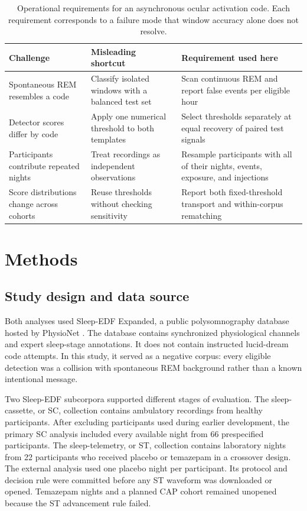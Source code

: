\documentclass[10pt,twocolumn]{article}
\begin{document}
\begin{table}[t]
\centering
\caption{Operational requirements for an asynchronous ocular activation code. Each requirement corresponds to a failure mode that window accuracy alone does not resolve.}
\label{tab:requirements}
\small
\begin{tabular}{p{}p{}p{}}
\toprule
Challenge & Misleading shortcut & Requirement used here \\
\midrule
Spontaneous REM resembles a code & Classify isolated windows with a balanced test set & Scan continuous REM and report false events per eligible hour \\
Detector scores differ by code & Apply one numerical threshold to both templates & Select thresholds separately at equal recovery of paired test signals \\
Participants contribute repeated nights & Treat recordings as independent observations & Resample participants with all of their nights, events, exposure, and injections \\
Score distributions change across cohorts & Reuse thresholds without checking sensitivity & Report both fixed-threshold transport and within-corpus rematching \\
\bottomrule
\end{tabular}
\end{table}

\section{Methods}

\subsection{Study design and data source}

Both analyses used Sleep-EDF Expanded, a public polysomnography database hosted by PhysioNet \citep{kemp2000,goldberger2000}. The database contains synchronized physiological channels and expert sleep-stage annotations. It does not contain instructed lucid-dream code attempts. In this study, it served as a negative corpus: every eligible detection was a collision with spontaneous REM background rather than a known intentional message.

Two Sleep-EDF subcorpora supported different stages of evaluation. The sleep-cassette, or SC, collection contains ambulatory recordings from healthy participants. After excluding participants used during earlier development, the primary SC analysis included every available night from 66 prespecified participants. The sleep-telemetry, or ST, collection contains laboratory nights from 22 participants who received placebo or temazepam in a crossover design. The external analysis used one placebo night per participant. Its protocol and decision rule were committed before any ST waveform was downloaded or opened. Temazepam nights and a planned CAP cohort remained unopened because the ST advancement rule failed.
\end{document}
